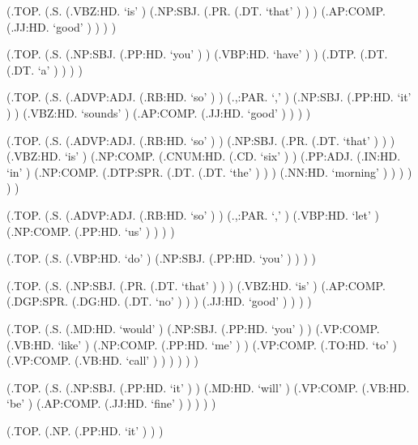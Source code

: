 \documentclass[10pt]{article}
\begin{document}
\begin{parsetree}  (.TOP. (.S. (.VBZ:HD. `is' ) (.NP:SBJ. (.PR. (.DT. `that' ) ) ) (.AP:COMP. (.JJ:HD. `good' ) ) ) ) \end{parsetree}

\begin{parsetree}  (.TOP. (.S. (.NP:SBJ. (.PP:HD. `you' ) ) (.VBP:HD. `have' ) ) (.DTP. (.DT. (.DT. `a' ) ) ) ) \end{parsetree}

\begin{parsetree}  (.TOP. (.S. (.ADVP:ADJ. (.RB:HD. `so' ) ) (.,:PAR. `,' ) (.NP:SBJ. (.PP:HD. `it' ) ) (.VBZ:HD. `sounds' ) (.AP:COMP. (.JJ:HD. `good' ) ) ) ) \end{parsetree}

\begin{parsetree}  (.TOP. (.S. (.ADVP:ADJ. (.RB:HD. `so' ) ) (.NP:SBJ. (.PR. (.DT. `that' ) ) ) (.VBZ:HD. `is' ) (.NP:COMP. (.CNUM:HD. (.CD. `six' ) ) (.PP:ADJ. (.IN:HD. `in' ) (.NP:COMP. (.DTP:SPR. (.DT. (.DT. `the' ) ) ) (.NN:HD. `morning' ) ) ) ) ) ) \end{parsetree}

\begin{parsetree}  (.TOP. (.S. (.ADVP:ADJ. (.RB:HD. `so' ) ) (.,:PAR. `,' ) (.VBP:HD. `let' ) (.NP:COMP. (.PP:HD. `us' ) ) ) ) \end{parsetree}

\begin{parsetree}  (.TOP. (.S. (.VBP:HD. `do' ) (.NP:SBJ. (.PP:HD. `you' ) ) ) ) \end{parsetree}

\begin{parsetree}  (.TOP. (.S. (.NP:SBJ. (.PR. (.DT. `that' ) ) ) (.VBZ:HD. `is' ) (.AP:COMP. (.DGP:SPR. (.DG:HD. (.DT. `no' ) ) ) (.JJ:HD. `good' ) ) ) ) \end{parsetree}

\begin{parsetree}  (.TOP. (.S. (.MD:HD. `would' ) (.NP:SBJ. (.PP:HD. `you' ) ) (.VP:COMP. (.VB:HD. `like' ) (.NP:COMP. (.PP:HD. `me' ) ) (.VP:COMP. (.TO:HD. `to' ) (.VP:COMP. (.VB:HD. `call' ) ) ) ) ) ) \end{parsetree}

\begin{parsetree}  (.TOP. (.S. (.NP:SBJ. (.PP:HD. `it' ) ) (.MD:HD. `will' ) (.VP:COMP. (.VB:HD. `be' ) (.AP:COMP. (.JJ:HD. `fine' ) ) ) ) ) \end{parsetree}

\begin{parsetree}  (.TOP. (.NP. (.PP:HD. `it' ) ) ) \end{parsetree}
\end{document}

